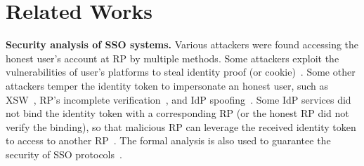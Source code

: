 \section{Related Works}
\label{sec:relatedwork}

\noindent\textbf{Security analysis of SSO systems.} Various attackers were found accessing the honest user's account at RP by multiple methods. 
Some attackers exploit the vulnerabilities of user's platforms to steal  identity proof (or cookie)~\cite{WangCW12,ArmandoCCCPS13}.
Some other attackers temper the identity token to impersonate an honest user, such as XSW~\cite{SomorovskyMSKJ12}, RP's incomplete verification~\cite{WangCW12,WangZLG16,MainkaMSW17}, and IdP spoofing~\cite{MainkaMS16,MainkaMSW17}. 
Some IdP services did not bind the identity token with a corresponding RP (or the honest RP did not verify the binding), so that malicious RP can leverage the received identity token to access to another RP~\cite{YangLCZ18,WangZLG16,MainkaMS16,MainkaMSW17}. 
The formal analysis is also used to guarantee the security of SSO protocols~\cite{FettKS16,FettKS17}.


